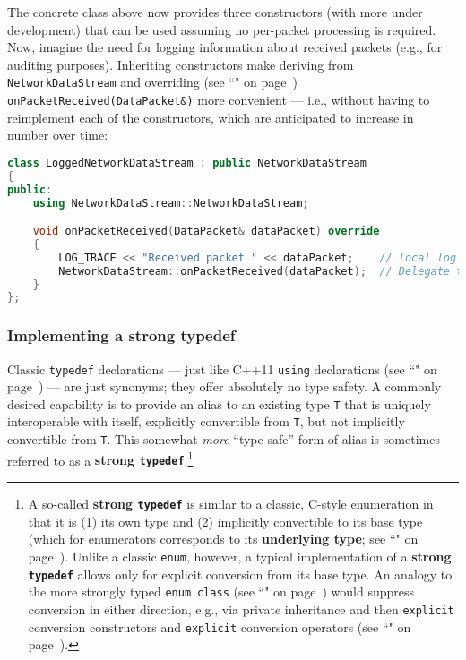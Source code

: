 \noindent The concrete class above now provides three constructors (with more
under development) that can be used assuming no per-packet processing is
required. Now, imagine the need for logging information about received
packets (e.g., for auditing purposes). Inheriting constructors make
deriving from \texttt{NetworkDataStream} and overriding (see
``" on page~\pageref{override})
\texttt{onPacketReceived(DataPacket\&)} more convenient --- i.e.,
without having to reimplement each of the constructors, which are
anticipated to increase in number over time:

\begin{lstlisting}[language=C++]
class LoggedNetworkDataStream : public NetworkDataStream
{
public:
    using NetworkDataStream::NetworkDataStream;

    void onPacketReceived(DataPacket& dataPacket) override
    {
        LOG_TRACE << "Received packet " << dataPacket;    // local log facility
        NetworkDataStream::onPacketReceived(dataPacket);  // Delegate to base.
    }
};
\end{lstlisting}
    

\subsubsection[Implementing a strong {\tt typedef}]{Implementing a strong {\SubsubsecCode typedef}}\label{implementing-a-strong-typedef}

Classic \texttt{typedef} declarations --- just like C++11
\texttt{using} declarations (see ``" on page~\pageref{alias-declarations-and-alias-templates}) --- are just synonyms; they
offer absolutely no type safety. A commonly desired capability is to
provide an alias to an existing type \texttt{T} that is uniquely
interoperable with itself, explicitly convertible from \texttt{T}, but
not implicitly convertible from \texttt{T}. This somewhat \emph{more}
``type-safe'' form of alias is sometimes referred to as a \textbf{strong
\texttt{typedef}}.{\cprotect\footnote{A so-called \textbf{strong
  \texttt{typedef}} is similar to a classic, C-style enumeration in
  that it is (1) its own type and (2) implicitly convertible to its
  base type (which for enumerators corresponds to its
  \textbf{underlying type}; see ``" on page~\pageref{explicit-enumeration-underlying-type}). Unlike a classic
  \texttt{enum}, however, a typical implementation of a \textbf{strong
  \texttt{typedef}} allows only for explicit conversion from its base
  type. An analogy to the more strongly typed
\texttt{enum}~\texttt{class} (see ``" on page~\pageref{enumclass}) would suppress conversion
  in either direction, e.g., via private inheritance and then
  \texttt{explicit} conversion constructors and
 \texttt{explicit} conversion operators (see ``" on page~\pageref{explicit-conversion-operators}).}}

